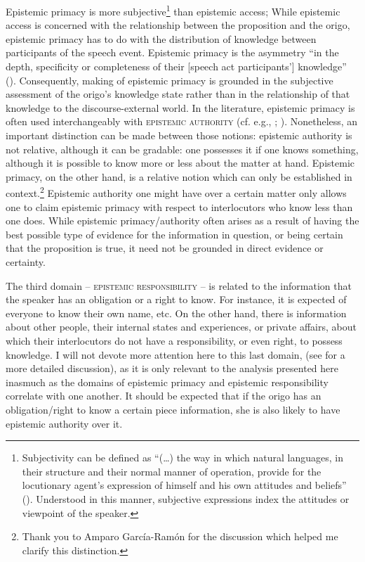 \documentclass[output=paper]{langscibook}
\begin{document}
Epistemic primacy is more subjective\footnote{Subjectivity can be defined as “(…) the way in which natural languages, in their structure and their normal manner of operation, provide for the locutionary agent’s expression of himself and his own attitudes and beliefs” (\citealt[102]{Lyons1982}). Understood in this manner, subjective expressions index the attitudes or viewpoint of the speaker.\label{fn:subjectivity}} than epistemic access; While epistemic access is concerned with the relationship between the proposition and the origo, epistemic primacy has to do with the distribution of knowledge between participants of the speech event. Epistemic primacy is the asymmetry “in the depth, specificity or completeness of their [speech act participants’] knowledge” (\citealt[13]{Stivers2011}). Consequently, making of epistemic primacy is grounded in the subjective assessment of the origo’s knowledge state rather than in the relationship of that knowledge to the discourse-external world. In the literature, epistemic primacy is often used interchangeably with \textsc{epistemic authority} (cf. e.g., \citealt{Grzech2016a}; \citealt{Garcia-Ramon2018}). Nonetheless, an important distinction can be made between those notions: epistemic authority is not relative, although it can be gradable: one possesses it if one knows something, although it is possible to know more or less about the matter at hand. Epistemic primacy, on the other hand, is a relative notion which can only be established in context.\footnote{Thank you to Amparo García-Ramón for the discussion which helped me clarify this distinction.} Epistemic authority one might have over a certain matter only allows one to claim epistemic primacy with respect to interlocutors who know less than one does. While epistemic primacy/authority often arises as a result of having the best possible type of evidence for the information in question, or being certain that the proposition is true, it need not be grounded in direct evidence or certainty.

The third domain – \textsc{epistemic responsibility} – is related to the information that the speaker has an obligation or a right to know. For instance, it is expected of everyone to know their own name, etc. On the other hand, there is information about other people, their internal states and experiences, or private affairs, about which their interlocutors do not have a responsibility, or even right, to possess knowledge. I will not devote more attention here to this last domain, (see \citealt[ch.5]{Grzech2016a} for a more detailed discussion), as it is only relevant to the analysis presented here inasmuch as the domains of epistemic primacy and epistemic responsibility correlate with one another. It should be expected that if the origo has an obligation/right to know a certain piece information, she is also likely to have epistemic authority over it.
\end{document}
